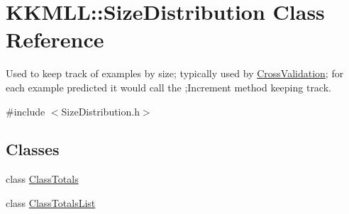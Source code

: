 \hypertarget{class_k_k_m_l_l_1_1_size_distribution}{}\section{K\+K\+M\+LL\+:\+:Size\+Distribution Class Reference}
\label{class_k_k_m_l_l_1_1_size_distribution}


Used to keep track of examples by size; typically used by \textquotesingle{}\hyperlink{class_k_k_m_l_l_1_1_cross_validation}{Cross\+Validation}\textquotesingle{}; for each example predicted it would call the ;Increment\textquotesingle{} method keeping track.  




{\ttfamily \#include $<$Size\+Distribution.\+h$>$}

\subsection*{Classes}
\begin{DoxyCompactItemize}
\item 
class \hyperlink{class_size_distribution_1_1_class_totals}{Class\+Totals}
\item 
class \hyperlink{class_size_distribution_1_1_class_totals_list}{Class\+Totals\+List}
\end{DoxyCompactItemize}
